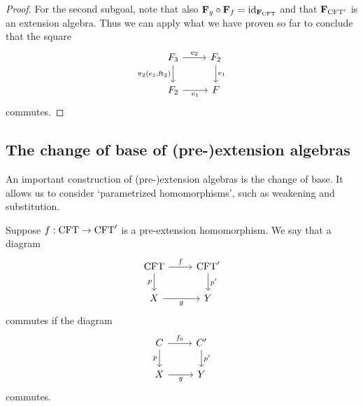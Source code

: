 \begin{proof}
For the second subgoal, note that also $\mathbf{F}_{g}\circ\mathbf{F}_{f}=
{\mathrm{id}_{\mathbf{F}_{\mathrm{CFT}}}}$ and that $\mathbf{F}_{\mathrm{CFT}'}$ is an extension algebra.
Thus we can apply what we have proven so far to conclude that the square
\begin{equation*}
\begin{tikzcd}
\stesysf_3 
  \ar{r}{\eext{2}} 
  \ar{d}[swap]{\pullbackpr{2}{\efamext}{\eft[2]}} 
  & 
\stesysf_2 
  \ar{d}{\efamext}
  \\
\stesysf_2
  \ar{r}[swap]{\efamext} 
  & 
\stesysf
\end{tikzcd}
\end{equation*}
commutes.
\end{proof}

\subsection{The change of base of (pre-)extension algebras}
\label{subsection:change_of_base}
An important construction of (pre-)extension algebras is the change of base. It
allows us to consider `parametrized homomorphisms', such as weakening and
substitution.

\begin{defn}
Suppose $f:\mathrm{CFT}\to\mathrm{CFT}'$ is a pre-extension homomorphism. We say that
a diagram
\begin{equation*}
\begin{tikzcd}
\stesys
  \ar{r}{f}
  \ar{d}[swap]{p}
  &
\stesys'
  \ar{d}{p'}
  \\
X \ar{r}[swap]{g}
  &
Y
\end{tikzcd}
\end{equation*}
commutes if the diagram
\begin{equation*}
\begin{tikzcd}
\stesysc
  \ar{r}{f_0}
  \ar{d}[swap]{p}
  &
\stesysc'
  \ar{d}{p'}
  \\
X \ar{r}[swap]{g}
  &
Y
\end{tikzcd}
\end{equation*}
commutes.
\end{defn}

